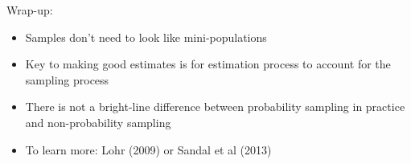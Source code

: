 \documentclass[aspectratio=169]{beamer}
\begin{document}
\begin{frame}

Wrap-up:
\begin{itemize}
\item Samples don't need to look like mini-populations
\pause
\item Key to making good estimates is for estimation process to account for the sampling process
\pause
\item There is not a bright-line difference between probability sampling in practice and non-probability sampling
\pause
\item To learn more: Lohr (2009) or Sandal et al (2013)
\end{itemize}

\end{frame}
\end{document}
